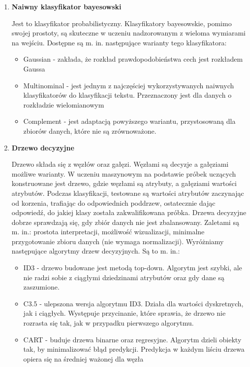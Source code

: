 \documentclass[polish,12pt]{aghthesis}
\begin{document}
\begin{enumerate}
    \item \textbf{Naiwny klasyfikator bayesowski}
    
    Jest to klasyfikator probabilistyczny. Klasyfikatory bayesowskie, pomimo swojej prostoty, są skuteczne w uczeniu nadzorowanym z wieloma wymiarami na wejściu. Dostępne są m. in. następujące warianty tego klasyfikatora:
    \begin{itemize}
        \item Gaussian - zakłada, że rozkład prawdopodobieństwa cech jest rozkładem Gaussa\cite{gauss}
        \item Multinominal - jest jednym z najczęściej wykorzystywanych naiwnych klasyfikatorów do klasyfikacji tekstu. Przeznaczony jest dla danych o rozkładzie wielomianowym\cite{complement}
        \item Complement - jest adaptacją powyższego wariantu, przystosowaną dla zbiorów danych, które nie są zrównoważone\cite{complement}.
    \end{itemize}
    
    
    \item \textbf{Drzewo decyzyjne}
    
    Drzewo składa się z węzłów oraz gałęzi. Węzłami są decyzje a gałęziami możliwe warianty. W uczeniu maszynowym na podstawie próbek uczących konstruowane jest drzewo, gdzie węzłami są atrybuty, a gałęziami wartości atrybutów. Podczas klasyfikacji, testowane są wartości atrybutów zaczynając od korzenia, trafiając do odpowiednich poddrzew, ostatecznie dając odpowiedź, do jakiej klasy została zakwalifikowana próbka. Drzewa decyzyjne dobrze sprawdzają się, gdy zbiór danych nie jest zbalansowany. Zaletami są m. in.: prostota interpretacji, możliwość wizualizacji, minimalne przygotowanie zbioru danych (nie wymaga normalizacji). Wyróżniamy następujące algorytmy drzew decyzyjnych. Są to m. in.:
    \begin{itemize}
        \item ID3 - drzewo budowane jest metodą top-down. Algorytm jest szybki, ale nie radzi sobie z ciągłymi dziedzinami atrybutów oraz gdy dane są zaszumione\cite{id3}.
        \item C3.5 - ulepszona wersja algorytmu ID3. Działa dla wartości dyskretnych, jak i ciągłych. Występuje przycinanie, które sprawia, że drzewo nie rozrasta się tak, jak w przypadku pierwszego algorytmu\cite{c45}.
        \item CART - buduje drzewa binarne oraz regresyjne. Algorytm dzieli  obiekty tak, by minimalizować błąd predykcji. Predykcja w każdym liściu drzewa opiera się na średniej ważonej dla węzła\cite{cart}
    \end{itemize}
    

\end{enumerate}
\end{document}
